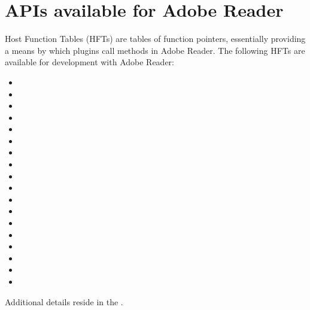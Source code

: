 \documentclass[letterpaper,12pt,english,openany,oneside]{sphinxmanual}
\begin{document}
\section{APIs available for Adobe Reader}
\label{\detokenize{Reader_Plugins:apis-available-for-adobe-reader}}
Host Function Tables (HFTs) are tables of function pointers, essentially providing a means by which plugins call methods in Adobe Reader. The following HFTs are available for development with Adobe Reader:
\begin{itemize}
\item {} 

\item {} 

\item {} 

\item {} 

\item {} 

\item {} 

\item {} 

\item {} 

\item {} 

\item {} 

\item {} 

\item {} 

\item {} 

\item {} 

\item {} 

\item {} 

\item {} 

\item {} 

\end{itemize}

Additional details reside in the .



\renewcommand{\indexname}{Index}
\printindex
\end{document}
